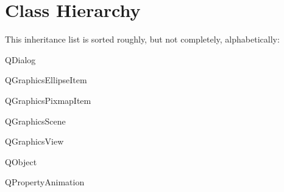 \section{Class Hierarchy}
This inheritance list is sorted roughly, but not completely, alphabetically\-:\begin{DoxyCompactList}
\item {}
\item {}
\item {}
\item Q\-Dialog\begin{DoxyCompactList}
\item {}
\end{DoxyCompactList}
\item Q\-Graphics\-Ellipse\-Item\begin{DoxyCompactList}
\item {}
\end{DoxyCompactList}
\item Q\-Graphics\-Pixmap\-Item\begin{DoxyCompactList}
\item {}
\end{DoxyCompactList}
\item Q\-Graphics\-Scene\begin{DoxyCompactList}
\item {}
\end{DoxyCompactList}
\item Q\-Graphics\-View\begin{DoxyCompactList}
\item {}
\end{DoxyCompactList}
\item Q\-Object\begin{DoxyCompactList}
\item {}
\item {}
\item {}
\end{DoxyCompactList}
\item Q\-Property\-Animation\begin{DoxyCompactList}
\item {}
\end{DoxyCompactList}
\end{DoxyCompactList}
